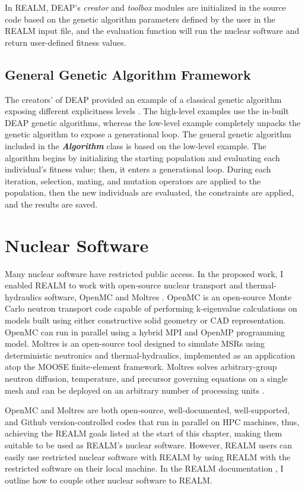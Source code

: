 In REALM, DEAP's \textit{creator} and \textit{toolbox} modules are initialized 
in the source code based on the genetic algorithm parameters defined by the user 
in the REALM input file, and the evaluation function will run the nuclear software and 
return user-defined fitness values. 

\subsection{General Genetic Algorithm Framework}
The creators' of DEAP provided an example of a classical genetic algorithm 
exposing different explicitness levels \cite{fortin_deap_2012}. 
The high-level examples use the in-built DEAP genetic algorithms, 
whereas the low-level example completely unpacks the genetic algorithm to expose 
a generational loop. 
The general genetic algorithm included in the \textbf{\textit{Algorithm}} class 
is based on the low-level example. 
The algorithm begins by initializing the starting population and evaluating 
each individual's fitness value; then, it enters a generational loop. 
During each iteration, selection, mating, and mutation operators are applied to 
the population, then the new individuals are evaluated, the constraints are 
applied, and the results are saved.


\section{Nuclear Software}
Many nuclear software have restricted public access. 
In the proposed work, I enabled \gls{REALM} to work with open-source nuclear 
transport and thermal-hydraulics software, OpenMC \cite{romano_openmc_2013} 
and Moltres \cite{lindsay_introduction_2018}.  
OpenMC is an open-source Monte Carlo neutron transport code capable of 
performing k-eigenvalue calculations on models built using either constructive 
solid geometry or CAD representation. 
OpenMC can run in parallel using a hybrid MPI and OpenMP programming model. 
Moltres is an open-source tool designed to simulate \glspl{MSR} using 
deterministic neutronics and thermal-hydraulics, implemented as an application 
atop the \gls{MOOSE} finite-element framework.  
Moltres solves arbitrary-group neutron diffusion, temperature, and precursor 
governing equations on a single mesh and can be deployed on an arbitrary number 
of processing units \cite{lindsay_introduction_2018}.

OpenMC and Moltres are both open-source, well-documented, well-supported, and 
Github version-controlled codes that run in parallel on \gls{HPC} machines, 
thus, achieving the \gls{REALM} goals listed at the start of this chapter, 
making them suitable to be used as \gls{REALM}'s nuclear software.
However, \gls{REALM} users can easily use restricted nuclear software with 
\gls{REALM} by using \gls{REALM} with the restricted software on their local 
machine. 
In the REALM documentation \cite{chee_arfcrealm_2021}, I outline how to couple 
other nuclear software to REALM. 

